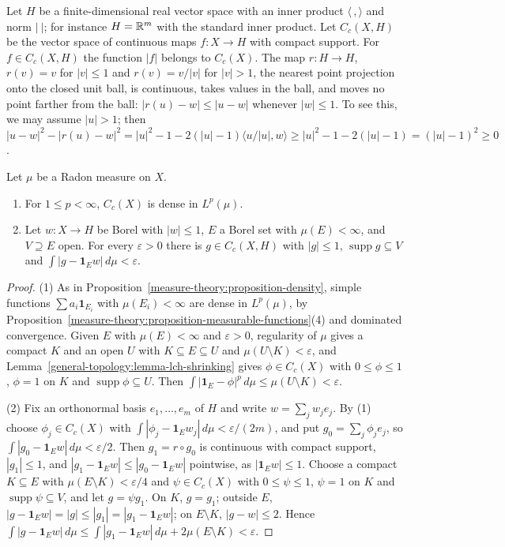 Let $H$ be a finite-dimensional real vector space with an inner product $\langle\,,\rangle$ and norm $|\ |$; for instance $H = \mathbb{R}^m$ with the standard inner product. Let $C_c(X, H)$ be the vector space of
continuous maps $f \colon X \to H$ with compact support. For $f \in C_c(X, H)$ the function $|f|$ belongs to $C_c(X)$. The map $r \colon H \to H$, $r(v) = v$ for $|v| \leq 1$ and $r(v) = v/|v|$ for $|v| > 1$, the
nearest point projection onto the closed unit ball, is continuous, takes values in the ball, and moves no point farther from the ball: $|r(u) - w| \leq |u - w|$ whenever $|w| \leq 1$. To see this,
we may assume $|u| > 1$; then
$|u - w|^2 - |r(u) - w|^2 = |u|^2 - 1 - 2(|u| - 1)\langle u/|u|, w\rangle \geq |u|^2 - 1 - 2(|u| - 1) = (|u| - 1)^2 \geq 0$.

\begin{lemma}\label{measure-theory:lemma-radon-approximation}
Let $\mu$ be a Radon measure on $X$.
\begin{enumerate}
\item For $1 \leq p < \infty$, $C_c(X)$ is dense in $L^p(\mu)$.
\item Let $w \colon X \to H$ be Borel with $|w| \leq 1$, $E$ a Borel set with $\mu(E) < \infty$, and $V \supseteq E$ open. For every $\varepsilon > 0$ there is $g \in C_c(X, H)$ with $|g| \leq 1$,
$\operatorname{supp}g \subseteq V$ and $\int|g - \mathbf{1}_Ew|\,d\mu < \varepsilon$.
\end{enumerate}
\end{lemma}

\begin{proof}
(1) As in Proposition~\ref{measure-theory:proposition-density}, simple functions $\sum a_i\mathbf{1}_{E_i}$ with $\mu(E_i) < \infty$ are dense in $L^p(\mu)$, by
Proposition~\ref{measure-theory:proposition-measurable-functions}(4) and dominated convergence. Given $E$ with $\mu(E) < \infty$ and $\varepsilon > 0$, regularity of $\mu$ gives a compact $K$ and an
open $U$ with $K \subseteq E \subseteq U$ and $\mu(U \setminus K) < \varepsilon$, and Lemma~\ref{general-topology:lemma-lch-shrinking} gives $\phi \in C_c(X)$ with $0 \leq \phi \leq 1$, $\phi = 1$ on $K$ and
$\operatorname{supp}\phi \subseteq U$. Then $\int|\mathbf{1}_E - \phi|^p\,d\mu \leq \mu(U \setminus K) < \varepsilon$.

(2) Fix an orthonormal basis $e_1, \ldots, e_m$ of $H$ and write $w = \sum_jw_je_j$. By (1) choose $\phi_j \in C_c(X)$ with $\int|\phi_j - \mathbf{1}_Ew_j|\,d\mu < \varepsilon/(2m)$, and put
$g_0 = \sum_j\phi_je_j$, so $\int|g_0 - \mathbf{1}_Ew|\,d\mu < \varepsilon/2$. Then $g_1 = r \circ g_0$ is continuous with compact support, $|g_1| \leq 1$, and $|g_1 - \mathbf{1}_Ew| \leq |g_0 - \mathbf{1}_Ew|$
pointwise, as $|\mathbf{1}_Ew| \leq 1$. Choose a compact $K \subseteq E$ with $\mu(E \setminus K) < \varepsilon/4$ and $\psi \in C_c(X)$ with $0 \leq \psi \leq 1$, $\psi = 1$ on $K$ and
$\operatorname{supp}\psi \subseteq V$, and let $g = \psi g_1$. On $K$, $g = g_1$; outside $E$, $|g - \mathbf{1}_Ew| = |g| \leq |g_1| = |g_1 - \mathbf{1}_Ew|$; on $E \setminus K$, $|g - w| \leq 2$. Hence
$\int|g - \mathbf{1}_Ew|\,d\mu \leq \int|g_1 - \mathbf{1}_Ew|\,d\mu + 2\mu(E \setminus K) < \varepsilon$.
\end{proof}

